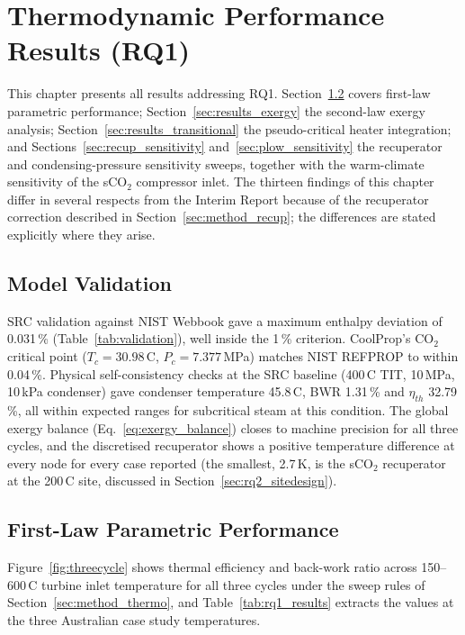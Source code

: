 \documentclass[12pt,a4paper]{report}
\begin{document}
\chapter{Thermodynamic Performance Results (RQ1)}
\label{ch:results_rq1}

This chapter presents all results addressing RQ1. Section~\ref{sec:results_firstlaw}
covers first-law parametric performance; Section~\ref{sec:results_exergy} the
second-law exergy analysis; Section~\ref{sec:results_transitional} the
pseudo-critical heater integration; and Sections~\ref{sec:recup_sensitivity}
and~\ref{sec:plow_sensitivity} the recuperator and condensing-pressure
sensitivity sweeps, together with the warm-climate sensitivity of the sCO$_2$
compressor inlet. The thirteen findings of this chapter differ in several
respects from the Interim Report because of the recuperator correction
described in Section~\ref{sec:method_recup}; the differences are stated
explicitly where they arise.

\section{Model Validation}
\label{sec:results_validation}

SRC validation against NIST Webbook gave a maximum enthalpy deviation of
0.031\,\% (Table~\ref{tab:validation}), well inside the 1\,\% criterion.
CoolProp's CO$_2$ critical point ($T_c = 30.98$\,\textdegree C, $P_c =
7.377$\,MPa) matches NIST REFPROP to within 0.04\,\%. Physical
self-consistency checks at the SRC baseline (400\,\textdegree C TIT,
10\,MPa, 10\,kPa condenser) gave condenser temperature 45.8\,\textdegree C,
BWR 1.31\,\% and $\eta_{th}$ 32.79\,\%, all within expected ranges for
subcritical steam at this condition. The global exergy balance
(Eq.~\ref{eq:exergy_balance}) closes to machine precision for all three
cycles, and the discretised recuperator shows a positive temperature
difference at every node for every case reported (the smallest, 2.7\,K, is
the sCO$_2$ recuperator at the 200\,\textdegree C site, discussed in
Section~\ref{sec:rq2_sitedesign}).

\section{First-Law Parametric Performance}
\label{sec:results_firstlaw}

Figure~\ref{fig:threecycle} shows thermal efficiency and back-work ratio
across 150--600\,\textdegree C turbine inlet temperature for all three cycles
under the sweep rules of Section~\ref{sec:method_thermo}, and
Table~\ref{tab:rq1_results} extracts the values at the three Australian case
study temperatures.
\end{document}
